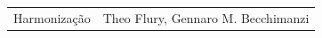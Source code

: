 \begin{flushright}
  \begin{tabular}{rl}
    Harmonização & Theo Flury, Gennaro M. Becchimanzi
  \end{tabular}
\end{flushright}

